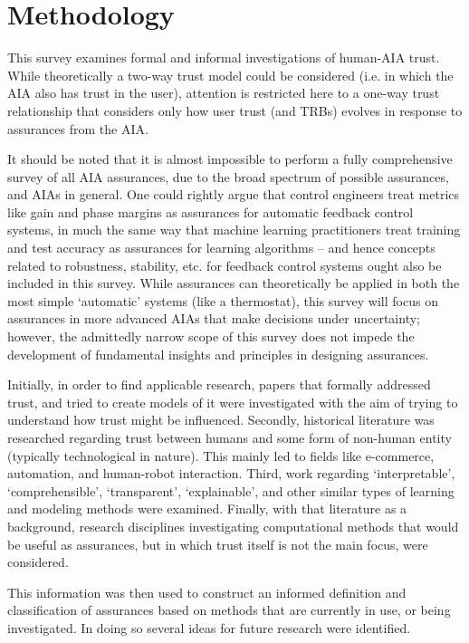 \section{Methodology} \label{sec:methodology}
    This survey examines formal and informal investigations of human-AIA trust. While theoretically a two-way trust model could be considered (i.e. in which the AIA also has trust in the user), attention is restricted here to a one-way trust relationship that considers only how user trust (and TRBs) evolves in response to assurances from the AIA. 

    It should be noted that it is almost impossible to perform a fully comprehensive survey of all AIA assurances, due to the broad spectrum of possible assurances, and AIAs in general. One could rightly argue that control engineers treat metrics like gain and phase margins as assurances for automatic feedback control systems, in much the same way that  machine learning practitioners treat training and test accuracy as assurances for learning algorithms -- and hence concepts related to robustness, stability, etc. for feedback control systems ought also be included in this survey. While assurances can theoretically be applied in both the most simple `automatic' systems (like a thermostat), this survey will focus on assurances in more advanced AIAs that make decisions under uncertainty; however, the admittedly narrow scope of this survey does not impede the development of fundamental insights and principles in designing assurances.

    Initially, in order to find applicable research, papers that formally addressed trust, and tried to create models of it were investigated with the aim of trying to understand how trust might be influenced. Secondly, historical literature was researched regarding trust between humans and some form of non-human entity (typically technological in nature). This mainly led to fields like e-commerce, automation, and human-robot interaction. Third, work regarding `interpretable', `comprehensible', `transparent', `explainable', and other similar types of learning and modeling methods were examined. Finally, with that literature as a background, research disciplines investigating computational methods that would be useful as assurances, but in which trust itself is not the main focus, were considered.

    This information was then used to construct an informed definition and classification of assurances based on methods that are currently in use, or being investigated. In doing so several ideas for future research were identified.
